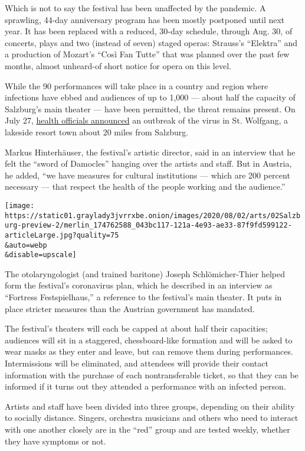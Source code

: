 Which is not to say the festival has been unaffected by the pandemic. A
sprawling, 44-day anniversary program has been mostly postponed until
next year. It has been replaced with a reduced, 30-day schedule, through
Aug. 30, of concerts, plays and two (instead of seven) staged operas:
Strauss's ``Elektra'' and a production of Mozart's ``Così Fan Tutte''
that was planned over the past few months, almost unheard-of short
notice for opera on this level.

While the 90 performances will take place in a country and region where
infections have ebbed and audiences of up to 1,000 --- about half the
capacity of Salzburg's main theater --- have been permitted, the threat
remains present. On July 27,
\href{https://uk.reuters.com/article/uk-health-coronavirus-austria/austrian-resort-town-st-wolfgang-grapples-with-coronavirus-outbreak-idUKKCN24S13J}{health
officials announced} an outbreak of the virus in St. Wolfgang, a
lakeside resort town about 20 miles from Salzburg.

Markus Hinterhäuser, the festival's artistic director, said in an
interview that he felt the ``sword of Damocles'' hanging over the
artists and staff. But in Austria, he added, ``we have measures for
cultural institutions --- which are 200 percent necessary --- that
respect the health of the people working and the audience.''

\texttt{[image: https://static01.graylady3jvrrxbe.onion/images/2020/08/02/arts/02Salzburg-preview-2/merlin\_174762588\_043bc117-121a-4e93-ae33-87f9fd599122-articleLarge.jpg?quality=75\\\&auto=webp\\\&disable=upscale]}

The otolaryngologist (and trained baritone) Joseph Schlömicher-Thier
helped form the festival's coronavirus plan, which he described in an
interview as ``Fortress Festspielhaus,'' a reference to the festival's
main theater. It puts in place stricter measures than the Austrian
government has mandated.

The festival's theaters will each be capped at about half their
capacities; audiences will sit in a staggered, chessboard-like formation
and will be asked to wear masks as they enter and leave, but can remove
them during performances. Intermissions will be eliminated, and
attendees will provide their contact information with the purchase of
each nontransferable ticket, so that they can be informed if it turns
out they attended a performance with an infected person.

Artists and staff have been divided into three groups, depending on
their ability to socially distance. Singers, orchestra musicians and
others who need to interact with one another closely are in the ``red''
group and are tested weekly, whether they have symptoms or not.

